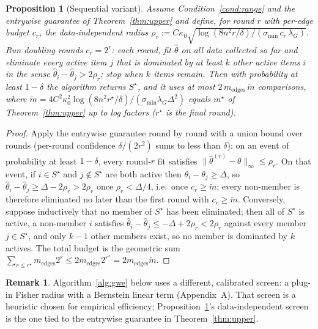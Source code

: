 \documentclass[11pt]{article}
\newtheorem{proposition}[theorem]{Proposition}
\theoremstyle{definition}
\newtheorem{remark}[theorem]{Remark}
\newcommand{\lG}{\lambda_G}
\begin{document}
\begin{proposition}[Sequential variant]
\label{prop:sequential}
Assume Condition~\ref{cond:range} and the entrywise guarantee of Theorem~\ref{thm:upper} and define, for round $r$ with per-edge budget $c_r$, the data-independent radius
$\rho_r:=C\kappa_0\sqrt{\log(8n^2r/\delta)/(\sigma_{\min}\,c_r\,\lG)}$.
Run doubling rounds $c_r=2^r$: each round, fit $\hat\theta$ on all data collected so far and eliminate every active item $j$ that is dominated by at least $k$ other active items $i$ in the sense $\hat\theta_i-\hat\theta_j>2\rho_r$; stop when $k$ items remain.  Then with probability at least $1-\delta$ the algorithm returns $S^\star$, and it uses at most $2\,m_{\mathrm{edges}}\,\tilde m$ comparisons, where $\tilde m=4C^2\kappa_0^2\log(8n^2r^\star/\delta)/(\sigma_{\min}\lG\Delta^2)$ equals $m^\star$ of Theorem~\ref{thm:upper} up to log factors ($r^\star$ is the final round).
\end{proposition}
\begin{proof}
Apply the entrywise guarantee round by round with a union bound over rounds (per-round confidence $\delta/(2r^2)$ sums to less than $\delta$): on an event of probability at least $1-\delta$, every round-$r$ fit satisfies $\|\hat\theta^{(r)}-\theta\|_\infty\le\rho_r$.  On that event, if $i\in S^\star$ and $j\notin S^\star$ are both active then $\theta_i-\theta_j\ge\Delta$, so $\hat\theta_i-\hat\theta_j\ge\Delta-2\rho_r>2\rho_r$ once $\rho_r<\Delta/4$, i.e.\ once $c_r\ge\tilde m$; every non-member is therefore eliminated no later than the first round with $c_r\ge\tilde m$.  Conversely, suppose inductively that no member of $S^\star$ has been eliminated; then all of $S^\star$ is active, a non-member $i$ satisfies $\hat\theta_i-\hat\theta_j\le-\Delta+2\rho_r<2\rho_r$ against every member $j\in S^\star$, and only $k-1$ other members exist, so no member is dominated by $k$ actives.  The total budget is the geometric sum $\sum_{r\le r^\star}m_{\mathrm{edges}}2^r\le 2m_{\mathrm{edges}}2^{r^\star}=2m_{\mathrm{edges}}\tilde m$.
\end{proof}
\begin{remark}
\label{rem:screen}
Algorithm~\ref{alg:gwe} below uses a different, calibrated screen: a plug-in Fisher radius with a Bernstein linear term (Appendix~A).  That screen is a heuristic chosen for empirical efficiency; Proposition~\ref{prop:sequential}'s data-independent screen is the one tied to the entrywise guarantee in Theorem~\ref{thm:upper}.
\end{remark}
\end{document}
